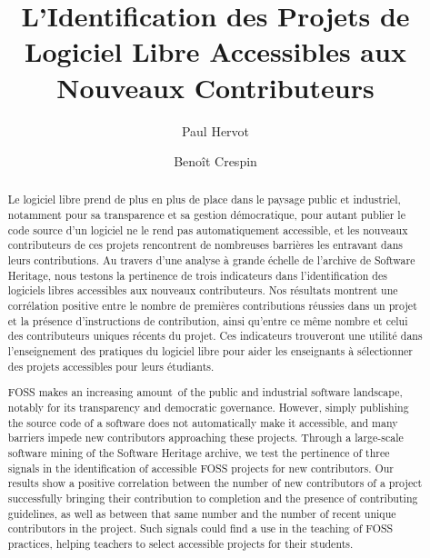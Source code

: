 \documentclass[dvipsnames,runningheads]{llncs}
\title{L'Identification des Projets de Logiciel Libre Accessibles aux Nouveaux Contributeurs}
\author{%
    Paul Hervot\inst{1}%
    \and%
    Benoît Crespin\inst{2}%
}
\institute{
    Laboratoire de Recherche de L’EPITA (LRE), 14-16 rue Voltaire, \\94270 Le Kremlin-Bicêtre, France
    \and
    Université de Limoges, XLIM/ASALI, UMR CNRS 7252, France
}
\begin{document}
    \maketitle

    \begin{abstract}
        Le logiciel libre prend de plus en plus de place dans le paysage public et industriel, notamment pour
        sa transparence et sa gestion démocratique, pour autant publier le code source d'un logiciel ne le
        rend pas automatiquement accessible, et les nouveaux contributeurs de ces projets rencontrent de
        nombreuses barrières les entravant dans leurs contributions. Au travers d'une analyse à grande échelle
        de l'archive de Software Heritage, nous testons la pertinence de trois indicateurs dans
        l'identification des logiciels libres accessibles aux nouveaux contributeurs. Nos résultats montrent
        une corrélation positive entre le nombre de premières contributions réussies dans un projet et la
        présence d'instructions de contribution, ainsi qu'entre ce même nombre et celui des contributeurs
        uniques récents du projet. Ces indicateurs trouveront une utilité dans l'enseignement des pratiques du
        logiciel libre pour aider les enseignants à sélectionner des projets accessibles pour leurs étudiants.

    \end{abstract}
    \vspace{-0.7\baselineskip} %
    \begin{abstract}
        FOSS makes an increasing amount of the public and industrial software landscape, notably for its
        transparency and democratic governance. However, simply publishing the source code of a software does
        not automatically make it accessible, and many barriers impede new contributors approaching these
        projects. Through a large-scale software mining of the Software Heritage archive, we test the
        pertinence of three signals in the identification of accessible FOSS projects for new contributors.
        Our results show a positive correlation between the number of new contributors of a project
        successfully bringing their contribution to completion and the presence of contributing guidelines, as
        well as between that same number and the number of recent unique contributors in the project. Such
        signals could find a use in the teaching of FOSS practices, helping teachers to select accessible
        projects for their students.

    \end{abstract}
\end{document}
